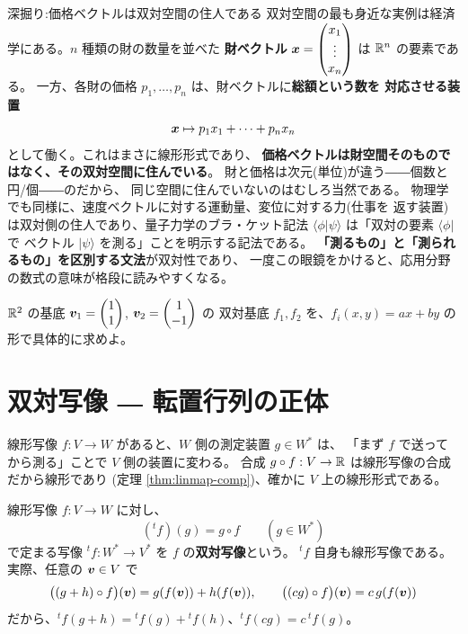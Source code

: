\begin{itembox}[l]{深掘り:価格ベクトルは双対空間の住人である}
双対空間の最も身近な実例は経済学にある。$n$ 種類の財の数量を並べた
\textbf{財ベクトル} $\bm{x} = \begin{pmatrix}x_1 \\ \vdots \\ x_n\end{pmatrix}$ は $\mathbb{R}^n$ の要素である。
一方、各財の価格 $p_1, \dots, p_n$ は、財ベクトルに\textbf{総額という数を
対応させる装置}
\[
\bm{x} \mapsto p_1 x_1 + \cdots + p_n x_n
\]
として働く。これはまさに線形形式であり、
\textbf{価格ベクトルは財空間そのものではなく、その双対空間に住んでいる}。
財と価格は次元(単位)が違う――個数と円/個――のだから、
同じ空間に住んでいないのはむしろ当然である。
物理学でも同様に、速度ベクトルに対する運動量、変位に対する力(仕事を
返す装置)は双対側の住人であり、量子力学のブラ・ケット記法
$\langle \phi | \psi \rangle$ は「双対の要素 $\langle \phi|$ で
ベクトル $|\psi\rangle$ を測る」ことを明示する記法である。
\textbf{「測るもの」と「測られるもの」を区別する文法}が双対性であり、
一度この眼鏡をかけると、応用分野の数式の意味が格段に読みやすくなる。
\end{itembox}

\begin{mondai}\label{q:dual}
$\mathbb{R}^2$ の基底 $\bm{v}_1 = \begin{pmatrix}1 \\ 1\end{pmatrix}$, $\bm{v}_2 = \begin{pmatrix}1 \\ -1\end{pmatrix}$ の
双対基底 $f_1, f_2$ を、$f_i(x, y) = ax + by$ の形で具体的に求めよ。
\end{mondai}

\section{双対写像 ― 転置行列の正体}

線形写像 $f : V \to W$ があると、$W$ 側の測定装置 $g \in W^{*}$ は、
「まず $f$ で送ってから測る」ことで $V$ 側の装置に変わる。
合成 $g \circ f : V \to \mathbb{R}$ は線形写像の合成だから線形であり
(定理 \ref{thm:linmap-comp})、確かに $V$ 上の線形形式である。

\begin{teigi}[双対写像]\label{def:dual-map}
線形写像 $f : V \to W$ に対し、
\[
({}^tf)(g) = g \circ f \qquad (g \in W^{*})
\]
で定まる写像 ${}^tf : W^{*} \to V^{*}$ を $f$ の\textbf{双対写像}という。
${}^tf$ 自身も線形写像である。実際、任意の $\bm{v} \in V$ で
\[
\bigl((g + h) \circ f\bigr)(\bm{v}) = g(f(\bm{v})) + h(f(\bm{v})), \qquad
\bigl((cg) \circ f\bigr)(\bm{v}) = c\,g(f(\bm{v}))
\]
だから、${}^tf(g + h) = {}^tf(g) + {}^tf(h)$、${}^tf(cg) = c\,{}^tf(g)$。
\end{teigi}

